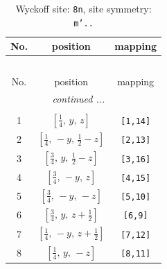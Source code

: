 \documentclass[fleqn,8pt]{jsarticle}
\begin{document}
\begin{longtable}{ccc}
\caption{Wyckoff site: {\tt 8n}, site symmetry: {\tt m'..}}
 \\
 \hline \hline
No. & position & mapping \\ \hline \endfirsthead

\multicolumn{2}{l}{\tablename\ \thetable{}} \\
 \hline \hline
No. & position & mapping \\ \hline \endhead

 \hline \hline
\multicolumn{2}{r}{\footnotesize\it continued ...} \\ \endfoot

 \hline \hline
\multicolumn{2}{r}{} \\ \endlastfoot

1 & $\left[ \frac{1}{4},\, y,\, z \right]$ & {\tt [1,14]} \\ \hline
2 & $\left[ \frac{1}{4},\, - y,\, \frac{1}{2} - z \right]$ & {\tt [2,13]} \\ \hline
3 & $\left[ \frac{3}{4},\, y,\, \frac{1}{2} - z \right]$ & {\tt [3,16]} \\ \hline
4 & $\left[ \frac{3}{4},\, - y,\, z \right]$ & {\tt [4,15]} \\ \hline
5 & $\left[ \frac{3}{4},\, - y,\, - z \right]$ & {\tt [5,10]} \\ \hline
6 & $\left[ \frac{3}{4},\, y,\, z + \frac{1}{2} \right]$ & {\tt [6,9]} \\ \hline
7 & $\left[ \frac{1}{4},\, - y,\, z + \frac{1}{2} \right]$ & {\tt [7,12]} \\ \hline
8 & $\left[ \frac{1}{4},\, y,\, - z \right]$ & {\tt [8,11]} \\
\end{longtable}
\renewcommand{\arraystretch}{1.2}
\end{document}
